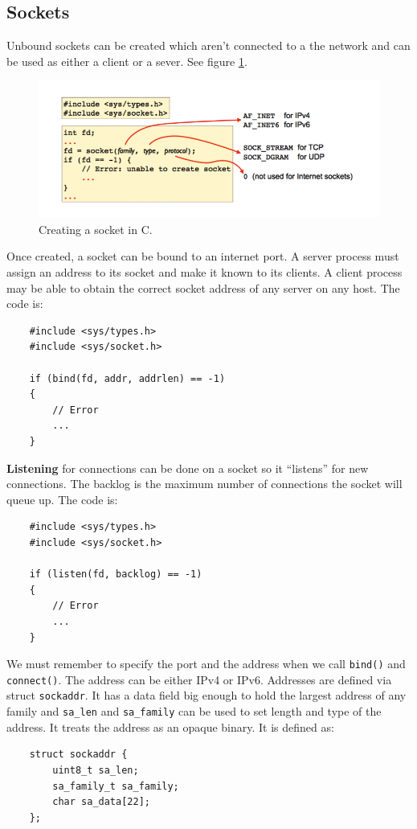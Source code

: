 \documentclass[twoside]{article}
\begin{document}
\subsection{Sockets}
Unbound sockets can be created which aren't connected to a the network and can 
be used as either a client or a sever. See figure \ref{fig:create-socket}.
\begin{figure}
  \includegraphics[width=\linewidth]{create-socket.png}
  \caption{Creating a socket in C.}
  \label{fig:create-socket}
\end{figure}
Once created, a socket can be bound to an internet port. A server process must 
assign an address to its socket and make it known to its clients. A client 
process may be able to obtain the correct socket address of any server on 
any host. The code is:
\begin{lstlisting}
    #include <sys/types.h>
    #include <sys/socket.h>

    if (bind(fd, addr, addrlen) == -1)
    {
        // Error 
        ...
    }
\end{lstlisting}
\textbf{Listening} for connections can be done on a socket so it ``listens'' 
for new connections. The backlog is the maximum number of connections the 
socket will queue up. The code is:
\begin{lstlisting}
    #include <sys/types.h>
    #include <sys/socket.h>

    if (listen(fd, backlog) == -1)
    {
        // Error
        ...
    }
\end{lstlisting}
We must remember to specify the port and the address when we call \texttt{bind()}
and \texttt{connect()}. The address can be either IPv4 or IPv6. Addresses 
are defined via struct \texttt{sockaddr}. It has a data field big enough
to hold the largest address of any family and \texttt{sa\_len} and \texttt{sa\_family}
can be used to set length and type of the address. It treats the address as
an opaque binary. It is defined as:
\begin{lstlisting}
    struct sockaddr {
        uint8_t sa_len;
        sa_family_t sa_family;
        char sa_data[22];
    };
\end{lstlisting}
\end{document}
